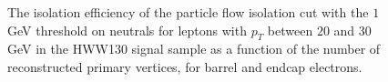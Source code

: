 \begin{figure}[!htbp]
\begin{center}
\caption{The isolation efficiency of the particle flow isolation cut with the $1$GeV threshold on neutrals
for leptons with $p_{T}$ between $20$ and $30$ GeV in the HWW130 signal sample as a function of the 
number of reconstructed primary vertices, for barrel and endcap electrons.}
\label{fig:EleIsoEffVsNVtx_PFIso_Pt20To30}
\end{center}
\end{figure}




